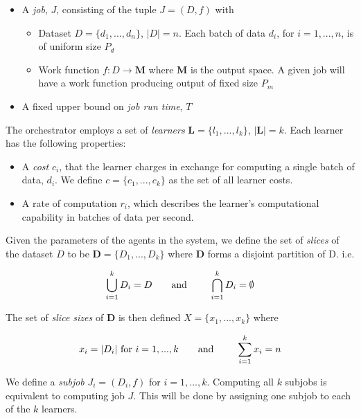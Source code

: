 \documentclass[../mthe-493-final-project.tex]{subfiles}
\begin{document}
    \begin{itemize}
        
        \item A \textit{job}, $J$, consisting of the tuple $J = (D, f)$ with
             \begin{itemize}
                  \item Dataset $D = \{d_1, ..., d_n\}$, $\vert D\vert = n$. Each batch of data $d_i$, for $i = 1,...,n$, is of uniform size $P_d$
                  \item Work function $f: D \rightarrow \mathbf{M}$ where $\mathbf{M}$ is the output space. A given job will have a work function producing output of fixed size $P_m$
              \end{itemize}
        \item A fixed upper bound on \textit{job run time}, $T$
    \end{itemize}
    
    The orchestrator employs a set of \textit{learners} $\mathbf{L} = \{l_1, ..., l_k\}$, $\vert\mathbf{L}\vert = k$. Each learner has the following properties:
    
    \begin{itemize}
        \item A \textit{cost} $c_i$, that the learner charges in exchange for computing a single batch of data, $d_i$. We define $c = \{c_1,...,c_k\}$ as the set of all learner costs. 
        \item A rate of computation $r_i$, which describes the learner's computational capability in batches of data per second.
    \end{itemize}
    
    Given the parameters of the agents in the system, we define the set of \textit{slices} of the dataset $D$ to be $\boldsymbol{D} = \{D_1,...,D_k\}$ where $\boldsymbol{D}$ forms a disjoint partition of D. i.e.
    
    \[\bigcup\limits_{i=1}^k D_i = D \textrm{\qquad and \qquad} \bigcap\limits_{i=1}^k D_i = \emptyset\]

    The set of \textit{slice sizes} of $\boldsymbol{D}$ is then defined $X = \{x_1,...,x_k\}$ where
    
    \[x_i = \vert D_i \vert \textrm{ for } i = 1,...,k \textrm{\qquad and \qquad} \sum_{i=1}^k x_i = n\]
    
    We define a \textit{subjob} $J_i = (D_i,f)$ for $i = 1,...,k$. Computing all $k$ subjobs is equivalent to computing job $J$. This will be done by assigning one subjob to each of the $k$ learners.
    
\end{document}
